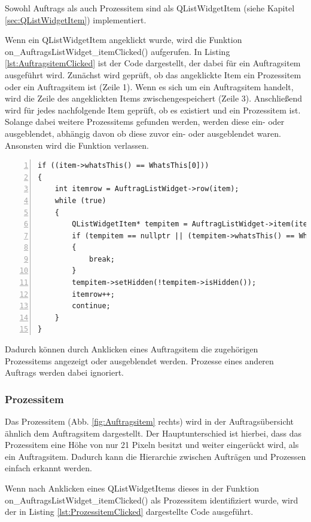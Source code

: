 Sowohl Auftrags als auch Prozessitem sind als QListWidgetItem (siehe Kapitel \ref{sec:QListWidgetItem}) implementiert.

Wenn ein QListWidgetItem angeklickt wurde, wird die Funktion on\_Auftrags\-List\-Widget\-\_item\-Clicked() aufgerufen. In Listing \ref{lst:AuftragsitemClicked} ist der Code dargestellt, der dabei für ein Auftragsitem ausgeführt wird. Zunächst wird geprüft, ob das angeklickte Item ein Prozessitem oder ein Auftragsitem ist (Zeile 1). Wenn es sich um ein Auftragsitem handelt, wird die Zeile des angeklickten Items zwischengespeichert (Zeile 3). Anschließend wird für jedes nachfolgende Item geprüft, ob es existiert und ein Prozessitem ist. Solange dabei weitere Prozessitems gefunden werden, werden diese ein- oder ausgeblendet, abhängig davon ob diese zuvor ein- oder ausgeblendet waren. Ansonsten wird die Funktion verlassen.

\begin{lstlisting}[frame=single, breaklines=true, numbers=left, stepnumber=2, firstnumber=1, numberstyle = \tiny, caption=Funktionsblock nach Klicken auf Auftragsitem ,label=lst:AuftragsitemClicked]
if ((item->whatsThis() == WhatsThis[0]))
{
    int itemrow = AuftragListWidget->row(item);
    while (true)
    {
        QListWidgetItem* tempitem = AuftragListWidget->item(itemrow+1);
        if (tempitem == nullptr || (tempitem->whatsThis() == WhatsThis[0]))
        {
            break;
        }
        tempitem->setHidden(!tempitem->isHidden());
        itemrow++;
        continue;
    }
}
\end{lstlisting}

Dadurch können durch Anklicken eines Auftragsitem die zugehörigen Prozessitems angezeigt oder ausgeblendet werden. Prozesse eines anderen Auftrags werden dabei ignoriert.

\subsubsection{Prozessitem}

Das Prozessitem (Abb. \ref{fig:Auftragsitem} rechts) wird in der Auftragsübersicht ähnlich dem Auftragsitem dargestellt. Der Hauptunterschied ist hierbei, dass das Prozessitem eine Höhe von nur 21 Pixeln besitzt und weiter eingerückt wird, als ein Auftragsitem. Dadurch kann die Hierarchie zwischen Aufträgen und Prozessen einfach erkannt werden. 

Wenn nach Anklicken eines QListWidgetItems dieses in der Funktion on\_\-Auftrags\-List\-Widget\_\-item\-Clicked() als Prozessitem identifiziert wurde, wird der in Listing \ref{lst:ProzessitemClicked} dargestellte Code ausgeführt. 

